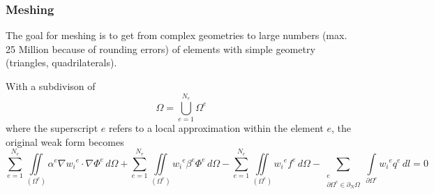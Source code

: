 \subsubsection{Meshing}
The goal for meshing is to get from complex geometries to large numbers (max. 25 Million because of rounding errors) of elements with simple geometry (triangles, quadrilaterals).\newline

With a subdivison of
\begin{equation*}
	\Omega = \bigcup\limits_{e=1}^{N_e} \Omega^e
\end{equation*}
where the superscript $e$ refers to a local approximation within the element $e$, the original weak form becomes
\begin{equation*}
	\sum_{e=1}^{N_e} \iint\limits_{\left(\Omega^e\right)} \alpha^e \nabla {w_i}^e \cdot \nabla \Phi^e\,d\Omega + \sum_{e=1}^{N_e} \iint\limits_{\left(\Omega^e\right)} {w_i}^e\beta^e\Phi^e\,d\Omega - \sum_{e=1}^{N_e} \iint\limits_{\left(\Omega^e\right)}{w_i}^e f^e\,d\Omega  - \sum_{{\substack{e\\\partial \Omega ^e\in\partial_N\Omega}}} \int\limits_{\partial \Omega^e} {w_i}^e q^e\,dl = 0
\end{equation*} 

